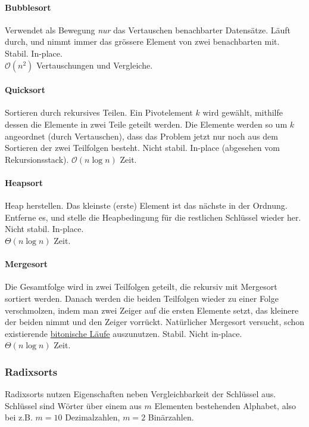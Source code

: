\documentclass[a4paper, 9pt, DIV=20]{scrartcl}
\newcommand{\Oh}{\mathcal{O}}
\newcommand{\Th}{\Theta}
\begin{document}
\paragraph{Bubblesort} Verwendet als Bewegung \emph{nur} das Vertauschen benachbarter Datensätze. Läuft durch, und nimmt immer das grössere Element von zwei benachbarten mit. Stabil. In-place. \\
$\Oh(n^{2})$ Vertauschungen und Vergleiche.

\paragraph{Quicksort} Sortieren durch rekursives Teilen. Ein Pivotelement $k$ wird gewählt, mithilfe dessen die Elemente in zwei Teile geteilt werden. Die Elemente werden so um $k$ angeordnet (durch Vertauschen), dass das Problem jetzt nur noch aus dem Sortieren der zwei Teilfolgen besteht. Nicht stabil. In-place (abgesehen vom Rekursionsstack). $\Oh(n\log{n})$ Zeit.

\paragraph{Heapsort} Heap herstellen. Das kleinste (erste) Element ist das nächste in der Ordnung. Entferne es, und stelle die Heapbedingung für die restlichen Schlüssel wieder her. Nicht stabil. In-place. \\
$\Th(n\log{n})$ Zeit.

\paragraph{Mergesort} Die Gesamtfolge wird in zwei Teilfolgen geteilt, die rekursiv mit Mergesort sortiert werden. Danach werden die beiden Teilfolgen wieder zu einer Folge verschmolzen, indem man zwei Zeiger auf die ersten Elemente setzt, das kleinere der beiden nimmt und den Zeiger vorrückt. Natürlicher Mergesort versucht, schon existierende \hyperref[bitonische_laufe]{bitonische Läufe} auszunutzen. Stabil. Nicht in-place. \\
$\Th(n\log{n})$ Zeit.

\subsubsection{Radixsorts}
Radixsorts nutzen Eigenschaften neben Vergleichbarkeit der Schlüssel aus. Schlüssel sind Wörter über einem aus $m$ Elementen bestehenden Alphabet, also bei z.B. $m=10$ Dezimalzahlen, $m=2$ Binärzahlen.
\end{document}
